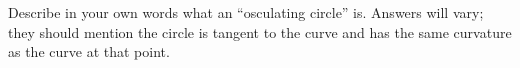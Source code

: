 {Describe in your own words what an ``osculating circle'' is. 
}
{Answers will vary; they should mention the circle is tangent to the curve and has the same curvature as the curve at that point.
}